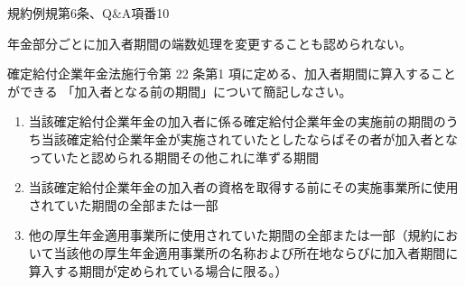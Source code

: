 \begin{explanationbox}
  規約例規第6条、Q\&A項番10

  年金部分ごとに加入者期間の端数処理を変更することも認められない。
\end{explanationbox}

\begin{shortanswer}[年金1 2020 問題2(1)\textcircled{1}]
  確定給付企業年金法施行令第 22 条第1 項に定める、加入者期間に算入することができる
「加入者となる前の期間」について簡記しなさい。
\end{shortanswer}

\begin{answerbox}
  \begin{enumerate}
    \item 当該確定給付企業年金の加入者に係る確定給付企業年金の実施前の期間のうち当該確定給付企業年金が実施されていたとしたならばその者が加入者となっていたと認められる期間その他これに準ずる期間
    \item 当該確定給付企業年金の加入者の資格を取得する前にその実施事業所に使用されていた期間の全部または一部
    \item 他の厚生年金適用事業所に使用されていた期間の全部または一部（規約において当該他の厚生年金適用事業所の名称および所在地ならびに加入者期間に算入する期間が定められている場合に限る。）
  \end{enumerate}
\end{answerbox}

